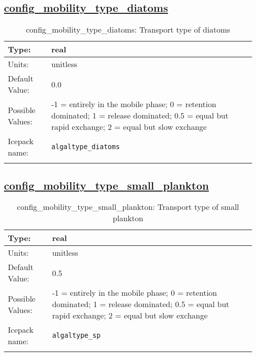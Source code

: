 \subsection[config\_mobility\_type\_diatoms]{\hyperref[sec:nm_tab_biogeochemistry]{config\_mobility\_type\_diatoms}}
\label{subsec:nm_sec_config_mobility_type_diatoms}
\begin{center}
\begin{longtable}{| p{2.0in} || p{4.0in} |}
    \hline
    Type: & real \\
    \hline
    Units: & \si{unitless} \\
    \hline
    Default Value: & 0.0 \\
    \hline
    Possible Values: & -1 = entirely in the mobile phase; 0 = retention dominated; 1 = release dominated; 0.5 = equal but rapid exchange; 2 = equal but slow exchange \\
    \hline
    \hline
    Icepack name: & \verb+algaltype_diatoms+ \\
    \caption{config\_mobility\_type\_diatoms: Transport type of diatoms}
\end{longtable}
\end{center}
\subsection[config\_mobility\_type\_small\_plankton]{\hyperref[sec:nm_tab_biogeochemistry]{config\_mobility\_type\_small\_plankton}}
\label{subsec:nm_sec_config_mobility_type_small_plankton}
\begin{center}
\begin{longtable}{| p{2.0in} || p{4.0in} |}
    \hline
    Type: & real \\
    \hline
    Units: & \si{unitless} \\
    \hline
    Default Value: & 0.5 \\
    \hline
    Possible Values: & -1 = entirely in the mobile phase; 0 = retention dominated; 1 = release dominated; 0.5 = equal but rapid exchange; 2 = equal but slow exchange \\
    \hline
    \hline
    Icepack name: & \verb+algaltype_sp+ \\
    \caption{config\_mobility\_type\_small\_plankton: Transport type of small plankton}
\end{longtable}
\end{center}
